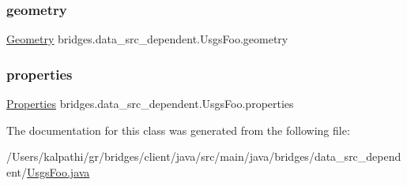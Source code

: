 \subsubsection{\texorpdfstring{geometry}{geometry}}
{\footnotesize\ttfamily \mbox{\hyperlink{classbridges_1_1data__src__dependent_1_1_usgs_foo_1_1_geometry}{Geometry}} bridges.\+data\+\_\+src\+\_\+dependent.\+Usgs\+Foo.\+geometry}

\mbox{\label{classbridges_1_1data__src__dependent_1_1_usgs_foo_a030d83e136f146824b5bda34a4c6fd1c}} 
\subsubsection{\texorpdfstring{properties}{properties}}
{\footnotesize\ttfamily \mbox{\hyperlink{classbridges_1_1data__src__dependent_1_1_usgs_foo_1_1_properties}{Properties}} bridges.\+data\+\_\+src\+\_\+dependent.\+Usgs\+Foo.\+properties}



The documentation for this class was generated from the following file\+:\begin{DoxyCompactItemize}
\item 
/\+Users/kalpathi/gr/bridges/client/java/src/main/java/bridges/data\+\_\+src\+\_\+dependent/\mbox{\hyperlink{_usgs_foo_8java}{Usgs\+Foo.\+java}}\end{DoxyCompactItemize}
